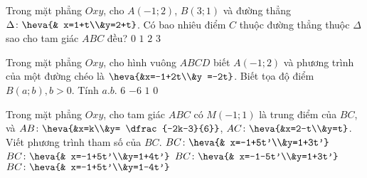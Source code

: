 \begin{ex}%
	Trong mặt phẳng $Oxy$, cho $A(-1;2)$, $B(3;1)$ và đường thẳng $\Delta\colon \heva{& x=1+t\\&y=2+t}$. Có bao nhiêu điểm $C$ thuộc đường thẳng thuộc $\Delta$ sao cho tam giác $ABC$ đều?
	\choice
	{\True$0$}
	{$1$}
	{$2$}
	{$3$}
\end{ex}

\begin{ex}%
	Trong mặt phẳng $Oxy$, cho hình vuông $ABCD$ biết $A(-1;2)$ và phương trình của một đường chéo là $\heva{&x=-1+2t\\&y =-2t}$. Biết tọa độ điểm $B(a;b), b>0$. Tính $a.b$.
	\choice
	{$6$}
	{\True $-6$}
	{$1$}
	{ $0$}
\end{ex}
\begin{ex}%
	Trong mặt phẳng $Oxy$, cho tam giác $ABC$ có $M(-1;1)$ là trung điểm  của $BC$, và $AB\colon \heva{&x=k\\&y= \dfrac{-2k-3}{6}}$, $AC \colon \heva{&x=2-t\\&y=t}$. Viết phương trình tham số của $BC$.
	\choice
	{\True $BC\colon \heva{& x=-1+5t'\\&y=1+3t'}$}
	{$BC\colon \heva{& x=-1+5t'\\&y=1+4t'}$}
	{$BC\colon \heva{& x=-1-5t'\\&y=1+3t'}$}
	{$BC\colon \heva{& x=-1+5t'\\&y=1-4t'}$}
\end{ex}

